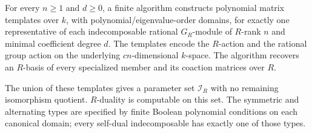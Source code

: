 \begin{theorem}
\label{C:artinian_algclosed_templates}
For every $n\geq1$ and $d\geq0$, a finite algorithm constructs polynomial
matrix templates over $k$, with polynomial/eigenvalue-order domains, for
exactly one representative of each indecomposable rational $G_R$-module
of $R$-rank $n$ and minimal coefficient degree $d$.
The templates encode the $R$-action and the rational group action on the
underlying $cn$-dimensional $k$-space. The algorithm recovers an $R$-basis
of every specialized member and its coaction matrices over $R$.

The union of these templates gives a parameter set $\mathscr I_R$ with no
remaining isomorphism quotient. $R$-duality is computable on this set.
The symmetric and alternating types are specified by finite Boolean
polynomial conditions on each canonical domain; every self-dual
indecomposable has exactly one of those types.
\end{theorem}
